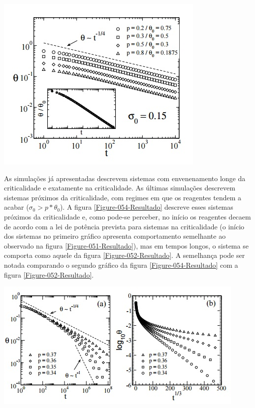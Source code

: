 { \centering
	\captionsetup{type=figure}
	\includegraphics[width=\columnwidth]{./figures/051-Resultado.jpg}
	\label{Figure-051-Resultado}
}

As simulações já apresentadas descrevem sistemas com envenenamento longe da
criticalidade e exatamente na criticalidade. As últimas simulações descrevem
sistemas próximos da criticalidade, com regimes em que os reagentes tendem a
acabar ($\sigma_0 > p*\theta_0$). A figura \ref{Figure-054-Resultado} descreve
esses sistemas próximos da criticalidade e, como pode-se perceber, no início os
reagentes decaem de acordo com a lei de potência prevista para sistemas na
criticalidade (o início dos sistemas no primeiro gráfico apresenta comportamento
semelhante ao observado na figura \ref{Figure-051-Resultado}), mas em tempos
longos, o sistema se comporta como aquele da figura \ref{Figure-052-Resultado}.
A semelhança pode ser notada comparando o segundo gráfico da figura
\ref{Figure-054-Resultado} com a figura \ref{Figure-052-Resultado}.

{ \centering
	\captionsetup{type=figure}
	\includegraphics[width=\columnwidth]{./figures/054-Resultado.jpg}
	\label{Figure-054-Resultado}
}
